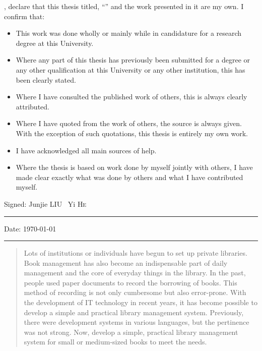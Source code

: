 \documentclass[
11pt, %
english, %
singlespacing, %
headsepline, %
]{MastersDoctoralThesis} %
\begin{document}

\begin{declaration}
\addchaptertocentry{\authorshipname} %
\noindent\authorname, declare that this thesis titled, \enquote{\ttitle} and the work presented in it are my own. I confirm that:

\begin{itemize}
\item This work was done wholly or mainly while in candidature for a research degree at this University.
\item Where any part of this thesis has previously been submitted for a degree or any other qualification at this University or any other institution, this has been clearly stated.
\item Where I have consulted the published work of others, this is always clearly attributed.
\item Where I have quoted from the work of others, the source is always given. With the exception of such quotations, this thesis is entirely my own work.
\item I have acknowledged all main sources of help.
\item Where the thesis is based on work done by myself jointly with others, I have made clear exactly what was done by others and what I have contributed myself.\\
\end{itemize}

\noindent Signed: Junjie \textsc{LIU} \ Yi \textsc{He}\\
\rule[0.5em]{25em}{0.5pt} %

\noindent Date: \today \\
\rule[0.5em]{25em}{0.5pt} %
\end{declaration}

\cleardoublepage



\begin{abstract}
\addchaptertocentry{\abstractname} %
Lots of institutions or individuals have begun to set up private libraries. Book management has also become an indispensable part of daily management and the core of everyday things in the library. In the past, people used paper documents to record the borrowing of books. This method of recording is not only cumbersome but also error-prone. With the development of IT technology in recent years, it has become possible to develop a simple and practical library management system. Previously, there were development systems in various languages, but the pertinence was not strong. Now, develop a simple, practical library management system for small or medium-sized books to meet the needs.
\end{abstract}
\end{document}
